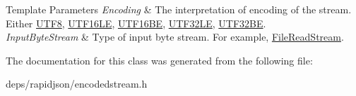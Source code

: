 \begin{DoxyTemplParams}{Template Parameters}
{\em Encoding} & The interpretation of encoding of the stream. Either \hyperlink{struct_u_t_f8}{U\+T\+F8}, \hyperlink{struct_u_t_f16_l_e}{U\+T\+F16\+LE}, \hyperlink{struct_u_t_f16_b_e}{U\+T\+F16\+BE}, \hyperlink{struct_u_t_f32_l_e}{U\+T\+F32\+LE}, \hyperlink{struct_u_t_f32_b_e}{U\+T\+F32\+BE}. \\
\hline
{\em Input\+Byte\+Stream} & Type of input byte stream. For example, \hyperlink{class_file_read_stream}{File\+Read\+Stream}. \\
\hline
\end{DoxyTemplParams}


The documentation for this class was generated from the following file\+:\begin{DoxyCompactItemize}
\item 
deps/rapidjson/encodedstream.\+h\end{DoxyCompactItemize}
